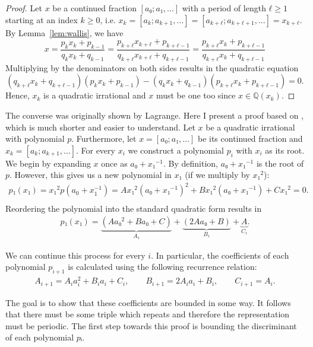 \begin{proof}
  Let $x$ be a continued fraction $[a₀; a₁, …]$ with a period of length $ℓ ≥ 1$
  starting at an index $k ≥ 0$,
  i.e. $x_k = [a_k; a_{k+1}, …] = [a_{k+ℓ}; a_{k+ℓ+1}, …] = x_{k+ℓ}$.
  By Lemma~\ref{lem:wallis}, we have
  \[
    x
    = \frac{p_k x_k + p_{k-1}}{q_k x_k + q_{k-1}}
    = \frac{p_{k+ℓ} x_{k+ℓ} + p_{k+ℓ-1}}{q_{k+ℓ} x_{k+ℓ} + q_{k+ℓ-1}}
    = \frac{p_{k+ℓ} x_k + p_{k+ℓ-1}}{q_{k+ℓ} x_k + q_{k+ℓ-1}}
  \]
  Multiplying by the denominators on both sides results in the quadratic equation
  \[
    (q_{k+ℓ} x_k + q_{k+ℓ-1})(p_k x_k + p_{k-1}) - (q_k x_k + q_{k-1}) (p_{k+ℓ} x_k + p_{k+ℓ-1}) = 0.
  \]
  Hence, $x_k$ is a quadratic irrational and $x$ must be one too since $x ∈ ℚ(x_k)$.
\end{proof}

The converse was originally shown by Lagrange.
Here I present a proof based on \cite{Northshield11},
which is much shorter and easier to understand.
Let $x$ be a quadratic irrational with polynomial $p$.
Furthermore, let $x = [a₀; a₁, \dots]$ be its continued fraction and $x_k = [a_k; a_{k+1}, \dots]$.
For every $x_i$ we construct a polynomial $p_i$ with $x_i$ as its root.
We begin by expanding $x$ once as $a₀ + x₁^{-1}$.
By definition, $a₀ + x₁^{-1}$ is the root of $p$.
However, this gives us a new polynomial in $x₁$ (if we multiply by $x₁^2$):
\begin{align*}
  p₁(x₁) = x₁^2 p(a_0 + x_1^{-1}) = A x₁^2 (a₀ + x₁^{-1})^2 + B x₁^2 (a₀ + x₁^{-1}) + C x₁^2 = 0. \\
\end{align*}
Reordering the polynomial into the standard quadratic form results in
\begin{align*}
  p₁(x₁) = \underbrace{(A a₀^2 + B a₀ + C)}_{A₁} + \underbrace{(2A a₀ + B)}_{B₁} + \underbrace{A}_{C₁}.
\end{align*}

We can continue this process for every $i$.
In particular, the coefficients of each polynomial $p_{i+1}$ is calculated
using the following recurrence relation:
\begin{align*}
  A_{i+1} = A_i a_i^2 + B_i a_i + C_i, \qquad
  B_{i+1} = 2 A_i a_i + B_i, \qquad
  C_{i+1} = A_i.
\end{align*}

The goal is to show that these coefficients are bounded in some way.
It follows that there must be some triple which repeats and therefore the
representation must be periodic.
The first step towards this proof is bounding the discriminant of each
polynomial $pᵢ$.

